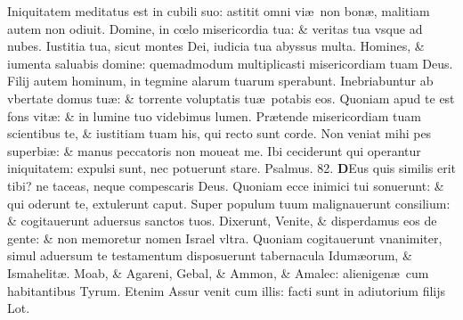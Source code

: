 \documentclass[a5paper,10pt]{book}
\def\ae{æ}
\def\oe{œ}
\begin{document}
\begin{multicols*}{2}
\newline \color{red} I\color{black}niquitatem meditatus est in cubili suo: astitit omni vi\ae \ non bon\ae , malitiam autem non odiuit.
\newline \color{red} D\color{black}omine, in c\oe lo misericordia tua: \& veritas tua vsque ad nubes.
\newline \color{red} I\color{black}ustitia tua, sicut montes Dei, iudicia tua abyssus multa.
\newline \color{red} H\color{black}omines, \& iumenta saluabis domine: quemadmodum multiplicasti misericordiam tuam Deus.
\newline \color{red} F\color{black}ilij autem hominum, in tegmine alarum tuarum sperabunt.
\newline \color{red} I\color{black}nebriabuntur ab vbertate domus tu\ae : \& torrente voluptatis tu\ae \ potabis eos.
\newline \color{red} Q\color{black}uoniam apud te est fons vit\ae : \& in lumine tuo videbimus lumen.
\newline \color{red} P\color{black}r\ae tende misericordiam tuam scientibus te, \& iustitiam tuam his, qui recto sunt corde.
\newline \color{red} N\color{black}on veniat mihi pes superbi\ae : \& manus peccatoris non moueat me.
\newline \color{red} I\color{black}bi ceciderunt qui operantur iniquitatem: expulsi sunt, nec potuerunt stare. \quad \color{red} Psalmus. \hypertarget{ps82}{82.} \color{black}
\vspace{-1em}
\lettrine[lines=2]{\bfseries \color{red} D}{}Eus quis similis erit tibi? ne taceas, neque compescaris Deus.
\newline \color{red} Q\color{black}uoniam ecce inimici tui sonuerunt: \& qui oderunt te, extulerunt caput.
\newline \color{red} S\color{black}uper populum tuum malignauerunt consilium: \& cogitauerunt aduersus sanctos tuos.
\newline \color{red} D\color{black}ixerunt, Venite, \& disperdamus eos de gente: \& non memoretur nomen Israel vltra.
\newline \color{red} Q\color{black}uoniam cogitauerunt vnanimiter, simul aduersum te testamentum disposuerunt tabernacula Idum\ae orum, \& Ismahelit\ae .
\newline \color{red} M\color{black}oab, \& Agareni, Gebal, \& Ammon, \& Amalec: alienigen\ae \ cum habitantibus Tyrum.
\newline \color{red} E\color{black}tenim Assur venit cum illis: facti sunt in adiutorium filijs Lot.

\end{multicols*}
\end{document}
